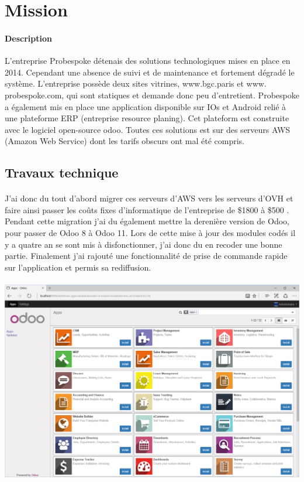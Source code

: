 \section{Mission}
\paragraph{Description}
L'entreprise Probespoke détenais des solutions technologiques mises en place en 2014.
Cependant une absence de suivi et de maintenance et fortement dégradé le système. L'entreprise possède deux sites vitrines, www.bgc.paris et www. probespoke.com, qui sont statiques et demande donc peu d'entretient.
Probespoke a également mis en place une application disponible sur IOs et Android relié à une plateforme ERP (entreprise resource planing). Cet plateform est construite avec le logiciel open-source odoo.
 Toutes ces solutions est sur des serveurs AWS (Amazon Web Service) dont les tarifs obscurs ont mal été compris.
\subsection{Travaux technique}
\paragraph{}
 J'ai donc du tout d'abord migrer ces serveurs d'AWS vers les serveurs d'OVH et faire ainsi passer les coûts fixes d'informatique de l'entreprise de \$1800 à \$500 .
 Pendant cette migration j'ai du également mettre la derenière version de Odoo, pour passer de Odoo 8 à Odoo 11.
 Lors de cette mise à jour des modules codés il y a quatre an se sont mis à disfonctionner, j'ai donc du en recoder une bonne partie. Finalement j'ai rajouté une fonctionnalité de prise de commande rapide sur l'application et permis sa rediffusion.
 \paragraph{}
 \includegraphics[width=14cm]{image/odoo.png}
